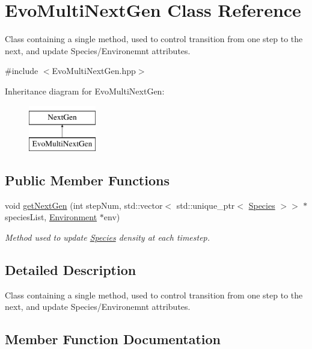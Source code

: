 \hypertarget{classEvoMultiNextGen}{}\section{Evo\+Multi\+Next\+Gen Class Reference}
\label{classEvoMultiNextGen}


Class containing a single method, used to control transition from one step to the next, and update Species/\+Environemnt attributes.  




{\ttfamily \#include $<$Evo\+Multi\+Next\+Gen.\+hpp$>$}

Inheritance diagram for Evo\+Multi\+Next\+Gen\+:\begin{figure}[H]
\begin{center}
\leavevmode
\includegraphics[height=2.000000cm]{classEvoMultiNextGen}
\end{center}
\end{figure}
\subsection*{Public Member Functions}
\begin{DoxyCompactItemize}
\item 
void \hyperlink{classEvoMultiNextGen_acab6fd876dc02feae353b52461b88861}{get\+Next\+Gen} (int step\+Num, std\+::vector$<$ std\+::unique\+\_\+ptr$<$ \hyperlink{classSpecies}{Species} $>$$>$ $\ast$species\+List, \hyperlink{classEnvironment}{Environment} $\ast$env)
\begin{DoxyCompactList}\small\item\em Method used to update \hyperlink{classSpecies}{Species} density at each timestep. \end{DoxyCompactList}\end{DoxyCompactItemize}


\subsection{Detailed Description}
Class containing a single method, used to control transition from one step to the next, and update Species/\+Environemnt attributes. 

\subsection{Member Function Documentation}
\hypertarget{classEvoMultiNextGen_acab6fd876dc02feae353b52461b88861}{}\label{classEvoMultiNextGen_acab6fd876dc02feae353b52461b88861} 

